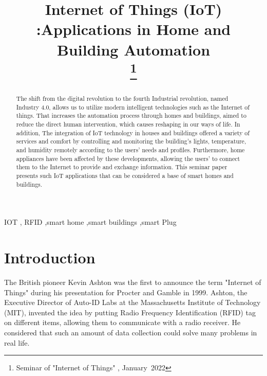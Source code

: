 \documentclass[conference]{IEEEtran}
\begin{document}
\title{Internet of Things (IoT) :Applications in  Home and Building Automation 
	\\

\thanks{Seminar of  "Internet of  Things" , January~2022}
}

\author{

}

\maketitle

\begin{abstract}
	
The shift from the digital revolution to the fourth Industrial revolution, named Industry 4.0, allows us to utilize modern intelligent technologies such as the Internet of things. That increases the automation process through homes and buildings, aimed to reduce the direct human intervention, which causes reshaping in our ways of life. In addition, The integration of  IoT technology in houses and buildings offered a variety of services and comfort by controlling and monitoring the building's lights, temperature, and humidity remotely according to the users' needs and profiles. Furthermore, home appliances have been affected by these developments, allowing the users' to connect them to the Internet to provide and exchange information. This seminar paper presents such IoT applications that can be considered a base of smart homes and buildings. 



\end{abstract}

\begin{IEEEkeywords}
IOT , RFID ,smart home ,smart buildings ,smart Plug 
\end{IEEEkeywords}

\section{Introduction}


The British pioneer Kevin Ashton was the first to announce the term "Internet of Things" during his presentation for Procter and Gamble in 1999. Ashton, the Executive Director of Auto-ID Labs at the Massachusetts Institute of Technology (MIT), invented the idea by putting Radio Frequency Identification (RFID) tag on different items, allowing them to communicate with a radio receiver. He considered that such an amount of data collection could solve many problems in real life. 
\end{document}
